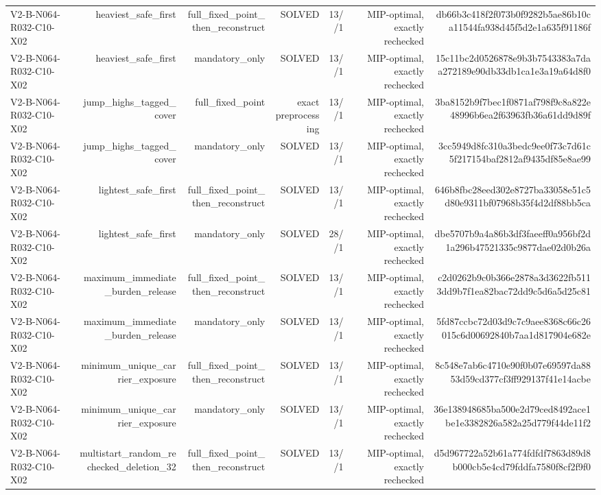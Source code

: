 {\begin{longtable}{lrrrrrr}
V2-B-N064-R032-C10-X02 & heaviest\_safe\_first & full\_fixed\_point\_then\_reconstruct & SOLVED & 13//1 & MIP-optimal, exactly rechecked & db66b3c418f2f073b0f9282b5ae86b10ca11544fa938d45f5d2e1a635f91186f \\
V2-B-N064-R032-C10-X02 & heaviest\_safe\_first & mandatory\_only & SOLVED & 13//1 & MIP-optimal, exactly rechecked & 15c11bc2d0526878e9b3b7543383a7daa272189e90db33db1ca1e3a19a64d8f0 \\
V2-B-N064-R032-C10-X02 & jump\_highs\_tagged\_cover & full\_fixed\_point & exact preprocessing & 13//1 & MIP-optimal, exactly rechecked & 3ba8152b9f7bec1f0871af798f9c8a822e48996b6ea2f63963fb36a61dd9d89f \\
V2-B-N064-R032-C10-X02 & jump\_highs\_tagged\_cover & mandatory\_only & SOLVED & 13//1 & MIP-optimal, exactly rechecked & 3cc5949d8fc310a3bedc9ee0f73c7d61c5f217154baf2812af9435df85e8ae99 \\
V2-B-N064-R032-C10-X02 & lightest\_safe\_first & full\_fixed\_point\_then\_reconstruct & SOLVED & 13//1 & MIP-optimal, exactly rechecked & 646b8fbc28eed302e8727ba33058e51c5d80e9311bf07968b35f4d2df88bb5ca \\
V2-B-N064-R032-C10-X02 & lightest\_safe\_first & mandatory\_only & SOLVED & 28//1 & MIP-optimal, exactly rechecked & dbe5707b9a4a86b3df3faeeff0a956bf2d1a296b47521335c9877dae02d0b26a \\
V2-B-N064-R032-C10-X02 & maximum\_immediate\_burden\_release & full\_fixed\_point\_then\_reconstruct & SOLVED & 13//1 & MIP-optimal, exactly rechecked & c2d0262b9c0b366e2878a3d3622fb5113dd9b7f1ea82bac72dd9c5d6a5d25c81 \\
V2-B-N064-R032-C10-X02 & maximum\_immediate\_burden\_release & mandatory\_only & SOLVED & 13//1 & MIP-optimal, exactly rechecked & 5fd87ccbc72d03d9c7c9aee8368c66c26015c6d00692840b7aa1d817904e682e \\
V2-B-N064-R032-C10-X02 & minimum\_unique\_carrier\_exposure & full\_fixed\_point\_then\_reconstruct & SOLVED & 13//1 & MIP-optimal, exactly rechecked & 8c548e7ab6c4710e90f0b07e69597da8853d59cd377cf3ff929137f41e14acbe \\
V2-B-N064-R032-C10-X02 & minimum\_unique\_carrier\_exposure & mandatory\_only & SOLVED & 13//1 & MIP-optimal, exactly rechecked & 36e138948685ba500e2d79ced8492ace1be1e3382826a582a25d779f44de11f2 \\
V2-B-N064-R032-C10-X02 & multistart\_random\_rechecked\_deletion\_32 & full\_fixed\_point\_then\_reconstruct & SOLVED & 13//1 & MIP-optimal, exactly rechecked & d5d967722a52b61a774fdfdf7863d89d8b000cb5e4cd79fddfa7580f8cf2f9f0 \\

\end{longtable}}
